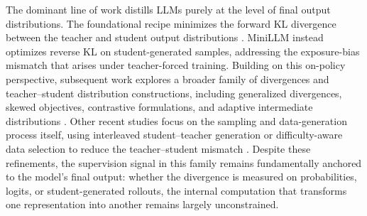 \documentclass{article} %
\theoremstyle{definition}
\theoremstyle{remark}
\begin{document}
The dominant line of work distills LLMs purely at the level of final output distributions. The foundational recipe minimizes the forward KL divergence between the teacher and student output distributions \cite{hinton2015distillingknowledgeneuralnetwork,Bucila2006ModelC}. MiniLLM \cite{gu2024minillmknowledgedistillationlarge} instead optimizes reverse KL on student-generated samples, addressing the exposure-bias mismatch that arises under teacher-forced training. Building on this on-policy perspective, subsequent work explores a broader family of divergences and teacher--student distribution constructions, including generalized divergences, skewed objectives, contrastive formulations, and adaptive intermediate distributions \cite{agarwal2024onpolicydistillationlanguagemodels,ko2024distillmstreamlineddistillationlarge,ko2025distillm2contrastiveapproachboosts,shin2026amid}. Other recent studies focus on the sampling and data-generation process itself, using interleaved student--teacher generation or difficulty-aware data selection to reduce the teacher--student mismatch \cite{xu2025speculative,pmlr-v267-he25c}. Despite these refinements, the supervision signal in this family remains fundamentally anchored to the model's final output: whether the divergence is measured on probabilities, logits, or student-generated rollouts, the internal computation that transforms one representation into another remains largely unconstrained. 
\end{document}
